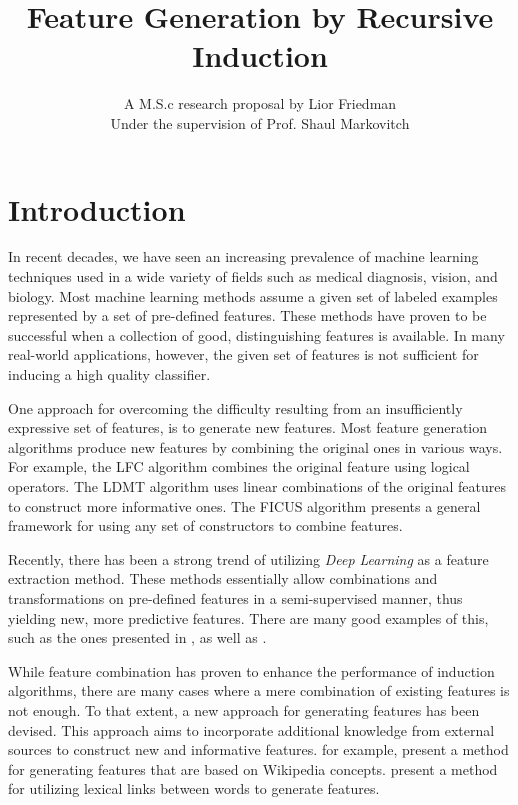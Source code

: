 \documentclass[12pt, a4paper]{article}
\theoremstyle{definition}
\begin{document}
\title{
	{
	Feature Generation by Recursive Induction%
	}\\
}
\author{
    {A M.S.c research proposal by Lior Friedman}\\
    {Under the supervision of Prof. Shaul Markovitch}
}

\maketitle

\section{Introduction}
\label{sec:Intro}
In recent decades, we have seen an increasing prevalence of machine learning techniques used in a wide variety of fields such as medical diagnosis, vision, and biology.
Most machine learning methods assume a given set of labeled examples represented by a set of
pre-defined features. These methods have proven to be successful when a collection of good,
distinguishing features is available.
In many real-world applications, however, the given set of features is not sufficient for inducing a high quality classifier.

One approach for overcoming the difficulty resulting from an insufficiently expressive set of features, is to generate new features.  Most feature generation algorithms produce new features by combining the original ones in various ways.  For example, the LFC algorithm \citep{ragavan1993complex} combines the original feature using logical operators.  The LDMT algorithm \citep{utgo1991linear} uses linear combinations of the original features to construct more informative ones.  The FICUS algorithm \citep{markovitch2002feature} presents a general framework for using any set of constructors to combine features.

Recently, there has been a strong trend of utilizing \emph{Deep Learning} \citep{lecun1998gradient, bengio2009learning} as a feature extraction method. These methods essentially allow combinations and transformations on pre-defined features in a semi-supervised manner, thus yielding new, more predictive features. 
There are many good examples of this, such as the ones presented in \citet{plotz2011feature}, as well as \citet{kim2013deep}.

While feature combination has proven to enhance the performance of induction algorithms, there are many cases where a mere combination of existing features is not enough.  To that extent, a new approach for generating features has been devised.  This approach aims to incorporate additional knowledge from external sources to construct new and informative features.
\citet{gabrilovich2007computing} for example, present a method for generating features that are based on Wikipedia concepts. \citet{jarmasz2012roget} present a method for utilizing lexical links between words to generate features.
\end{document}
